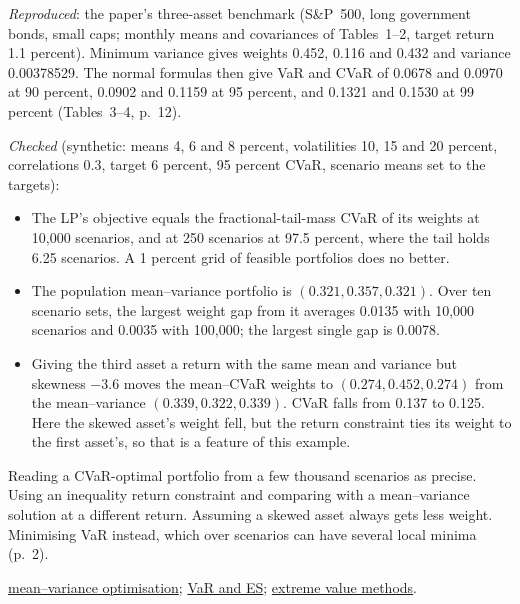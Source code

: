 \begin{qfmethod}
 \emph{Reproduced}: the paper's three-asset benchmark (S\&P~500, long government bonds, small caps; monthly means and covariances of Tables~1--2, target return 1.1 percent). Minimum variance gives weights 0.452, 0.116 and 0.432 and variance 0.00378529. The normal formulas then give VaR and CVaR of 0.0678 and 0.0970 at 90 percent, 0.0902 and 0.1159 at 95 percent, and 0.1321 and 0.1530 at 99 percent (Tables~3--4, p.~12).

\emph{Checked} (synthetic: means 4, 6 and 8 percent, volatilities 10, 15 and 20 percent, correlations 0.3, target 6 percent, 95 percent CVaR, scenario means set to the targets):
\begin{itemize}
\item The LP's objective equals the fractional-tail-mass CVaR of its weights at 10{,}000 scenarios, and at 250 scenarios at 97.5 percent, where the tail holds 6.25 scenarios. A 1 percent grid of feasible portfolios does no better.
\item The population mean--variance portfolio is $(0.321,0.357,0.321)$. Over ten scenario sets, the largest weight gap from it averages 0.0135 with 10{,}000 scenarios and 0.0035 with 100{,}000; the largest single gap is 0.0078.
\item Giving the third asset a return with the same mean and variance but skewness $-3.6$ moves the mean--CVaR weights to $(0.274,0.452,0.274)$ from the mean--variance $(0.339,0.322,0.339)$. CVaR falls from 0.137 to 0.125. Here the skewed asset's weight fell, but the return constraint ties its weight to the first asset's, so that is a feature of this example.
\end{itemize}

 Reading a CVaR-optimal portfolio from a few thousand scenarios as precise. Using an inequality return constraint and comparing with a mean--variance solution at a different return. Assuming a skewed asset always gets less weight. Minimising VaR instead, which over scenarios can have several local minima (p.~2).

 \hyperref[mod:mean-variance-portfolio-optimisation]{mean--variance optimisation}; \hyperref[meth:var-es-estimation-methods]{VaR and ES}; \hyperref[meth:extreme-value-tail-estimation]{extreme value methods}.

\end{qfmethod}

